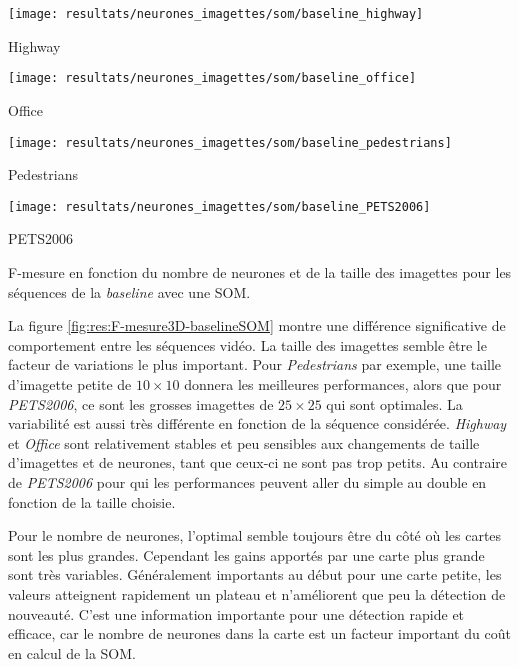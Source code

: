 	\begin{figureth}
		\begin{subfigureth}{.45\textwidth}
			\texttt{[image: resultats/neurones\_imagettes/som/baseline\_highway]}\caption{Highway}
		\end{subfigureth}
		\begin{subfigureth}{.45\textwidth}
			\texttt{[image: resultats/neurones\_imagettes/som/baseline\_office]}\caption{Office}
		\end{subfigureth}
		\begin{subfigureth}{.45\textwidth}
			\texttt{[image: resultats/neurones\_imagettes/som/baseline\_pedestrians]}\caption{Pedestrians}
		\end{subfigureth}
		\begin{subfigureth}{.45\textwidth}
			\texttt{[image: resultats/neurones\_imagettes/som/baseline\_PETS2006]}\caption{PETS2006}
		\end{subfigureth}
		\caption[Nombre de neurones et de taille des imagettes, SOM/baseline]{F-mesure en fonction du nombre de neurones et de la taille des imagettes pour les séquences de la \textit{baseline} avec une SOM.}\label{fig:res:F-mesure3D-baselineSOM}
	\end{figureth}

	La figure \ref{fig:res:F-mesure3D-baselineSOM} montre une différence significative de comportement entre les séquences vidéo. La taille des imagettes semble être le facteur de variations le plus important. Pour \textit{Pedestrians} par exemple, une taille d'imagette petite de $10\times10$ donnera les meilleures performances, alors que pour \textit{PETS2006}, ce sont les grosses imagettes de $25\times25$ qui sont optimales. La variabilité est aussi très différente en fonction de la séquence considérée. \textit{Highway} et \textit{Office} sont relativement stables et peu sensibles aux changements de taille d'imagettes et de neurones, tant que ceux-ci ne sont pas trop petits. Au contraire de \textit{PETS2006} pour qui les performances peuvent aller du simple au double en fonction de la taille choisie.

	Pour le nombre de neurones, l'optimal semble toujours être du côté où les cartes sont les plus grandes. Cependant les gains apportés par une carte plus grande sont très variables. Généralement importants au début pour une carte petite, les valeurs atteignent rapidement un plateau et n'améliorent que peu la détection de nouveauté. C'est une information importante pour une détection rapide et efficace, car le nombre de neurones dans la carte est un facteur important du coût en calcul de la SOM.

